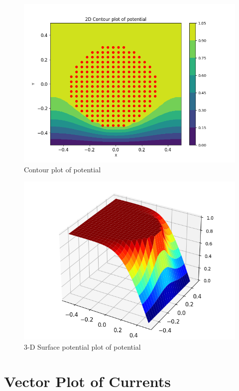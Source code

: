 \documentclass[11pt, a4paper]{article}
\begin{document}
\begin{figure}[tbh]
 \centering
 \includegraphics[scale=0.7]{Figure7.png}  
 \caption{Contour plot of potential}
\end{figure}

\begin{figure}[!tbh]
 \centering
 \includegraphics[scale=0.7]{Figure8.png}  
 \caption{3-D Surface potential plot of potential}
\end{figure}
\newpage
\newpage

\section{Vector Plot of Currents}
\end{document}
